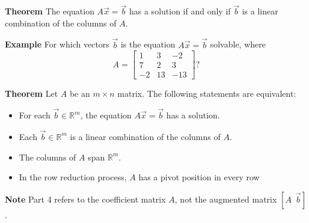   \begin{frame}[fragile]
\textbf{Theorem} The equation $A \vec{x} = \vec{b}$ has a solution
 if and only if $\vec{b}$ is a linear combination of the columns of $A$.


%
%
\end{frame}

  \begin{frame}[fragile]
\textbf{Example}
For which vectors $\vec{b}$ is the equation $A\vec{x}=\vec{b}$
solvable, where 
\[
 A = \left[\begin{array}{rrr}
      1 & 3 & -2 \\
      7 & 2 & 3  \\
      -2 & 13 &-13
     \end{array}\right]?
\]

\end{frame}

  \begin{frame}[fragile]
\textbf{Theorem}
Let $A$ be an $m \times n$ matrix. The following statements are equivalent:
\begin{itemize}
 \item For each $\vec{b}\in \mathbb R^m$, the equation $A\vec{x}=\vec{b}$ has a solution.
 \item Each $\vec{b} \in \mathbb R^m$ is a linear combination of the columns of $A$.
 \item The columns of $A$ span $\mathbb R^m$.
 \item In the row reduction process, $A$ has a pivot position in every row
\end{itemize}


\textbf{Note}
Part 4 refers to the coefficient matrix $A$, not the augmented matrix $[A \ \  \vec{b}]$.

\end{frame}


